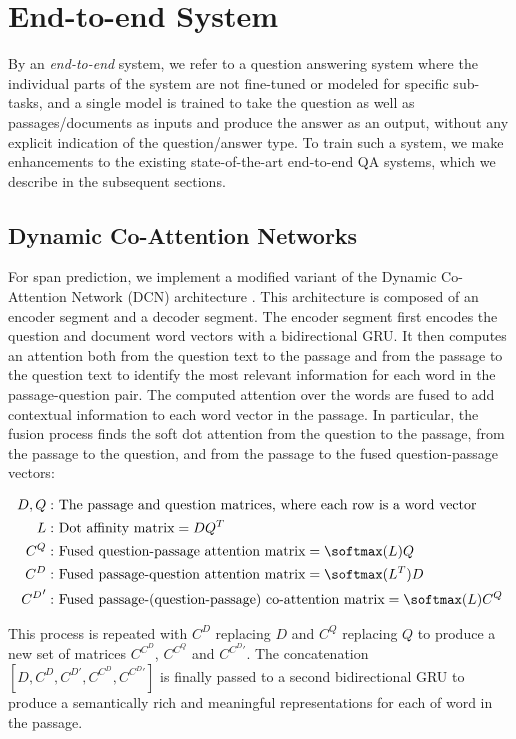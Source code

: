 \section{End-to-end System}

By an \textit{end-to-end} system, we refer to a question answering system where the individual parts of the system are not fine-tuned or modeled for specific sub-tasks, and a single model is trained to take the question as well as passages/documents as inputs and produce the answer as an output, without any explicit indication of the question/answer type. To train such a system, we make enhancements to the existing state-of-the-art end-to-end QA systems, which we describe in the subsequent sections.

\subsection{Dynamic Co-Attention Networks}

For span prediction, we implement a modified variant of the Dynamic Co-Attention Network (DCN) architecture \cite{DCN}. This architecture is composed of an encoder segment and a decoder segment. The encoder segment first encodes the question and document word vectors with a bidirectional GRU. It then computes an attention both from the question text to the passage and from the passage to the question text to identify the most relevant information for each word in the passage-question pair. The computed attention over the words are fused to add contextual information to each word vector in the passage. In particular, the fusion process finds the soft dot attention from the question to the passage, from the passage to the question, and from the passage to the fused question-passage vectors:

\begin{align*}
D, Q: &\text{ The passage and question matrices, where each row is a word vector} \\
L: &\text{ Dot affinity matrix} = D Q^T \\
C^Q: &\text{ Fused question-passage attention matrix} = \softmax(L) Q \\
C^D: &\text{ Fused passage-question attention matrix} = \softmax(L^T) D \\
{C^D}': &\text{ Fused passage-(question-passage) co-attention matrix} = \softmax(L) C^Q \\
\end{align*}

This process is repeated with $C^D$ replacing $D$ and $C^Q$ replacing $Q$ to produce a new set of matrices $C^{C^D}$, $C^{C^Q}$ and $C^{C^D \prime}$. The concatenation $[D, C^D, C^{D \prime}, C^{C^D}, C^{C^D \prime}]$ is finally passed to a second bidirectional GRU to produce a semantically rich and meaningful representations for each of word in the passage.

